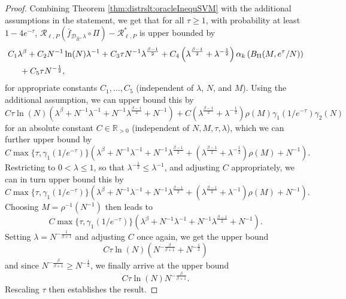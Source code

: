 \documentclass[letterpaper]{article} %
\newcommand{\R}{\mathbb{R}}
\newcommand{\Rp}{\R_{> 0}}
\newcommand{\dataSet}{\mathcal{D}}
\newcommand{\risk}{\mathcal{R}} %
\newcommand{\Risk}[2]{\risk_{{#1},{#2}}} %
\newcommand{\RiskBayes}[2]{\risk_{{#1},{#2}}^\ast} %
\newcommand{\hilbertianEmbed}{\Pi} %
\newcommand{\hilbertianEmbedBound}{B_\hilbertianEmbed} %
\newcommand{\clipped}[1]{\bar{#1}}
\begin{document}
\begin{proof}
Combining Theorem \ref{thm:distrslt:oracleInequSVM} with the additional assumptions in the statement, we get that for all $\tau\geq 1$, with probability at least $1-4e^{-\tau}$, $ \Risk{\ell}{P}(\clipped{f}_{\dataSet_{\hat\hilbertianEmbed},\lambda} \circ \hilbertianEmbed) - \RiskBayes{\ell}{P}$
is upper bounded by 
\begin{align*}
    & C_1 \lambda^\beta + C_2 N^{-1}\ln(N) \lambda^{-1} + C_3 \tau N^{-1} \lambda^{\frac{\beta-1}{2}} 
    + C_4\left(\lambda^{\frac{\beta-1}{2}} + \lambda^{-\frac12}\right)\alpha_k\left(\hilbertianEmbedBound(M,e^\tau/N)\right) \\
    & \hspace{0.5cm} + C_5 \tau N^{-\frac12},
\end{align*} 
for appropriate constants $C_1,\ldots,C_5$ (independent of $\lambda$, $N$, and $M$).
Using the additional assumption, we can upper bound this by
\begin{equation*}
    C \tau \ln(N) \left( \lambda^\beta + N^{-1}\lambda^{-1}  + N^{-1} \lambda^{\frac{\beta-1}{2}} + N^{-1} \right)
    + 
    C \left(\lambda^{\frac{\beta-1}{2}} + \lambda^{-\frac12}\right) \rho(M)\gamma_1(1/e^{-\tau})\gamma_2(N)
\end{equation*}
for an absolute constant $C\in\Rp$ (independent of $N,M,\tau,\lambda$), which we can further upper bound by
\begin{equation*}
    C \max\{\tau, \gamma_1(1/e^{-\tau})\} \left(
        \lambda^\beta + N^{-1}\lambda^{-1}  + N^{-1} \lambda^{\frac{\beta-1}{2}} + \left(\lambda^{\frac{\beta-1}{2}} + \lambda^{-\frac12}\right)\rho(M) + N^{-1}
    \right).
\end{equation*}
Restricting to $0<\lambda\leq 1$, so that $\lambda^{-\frac12} \leq \lambda^{-1}$, and adjusting $C$ appropriately, we can in turn upper bound this by
\begin{equation*}
     C \max\{\tau, \gamma_1(1/e^{-\tau})\} \left(
        \lambda^\beta + N^{-1}\lambda^{-1}  + N^{-1} \lambda^{\frac{\beta-1}{2}} + \left(\lambda^{\frac{\beta-1}{2}} + \lambda^{-1}\right)\rho(M) + N^{-1}
    \right).
\end{equation*}
Choosing $M=\rho^{-1}(N^{-1})$ then leads to
\begin{equation*}
         C \max\{\tau, \gamma_1(1/e^{-\tau})\} \left(
        \lambda^\beta + N^{-1}\lambda^{-1}  + N^{-1} \lambda^{\frac{\beta-1}{2}} + N^{-1}
    \right).
\end{equation*}
Setting $\lambda=N^{-\frac{1}{\beta+1}}$ and adjusting $C$ once again, we get the upper bound
\begin{equation*}
     C \tau \ln(N) \left( N^{-\frac{\beta}{\beta+1}} + N^{-\frac12} \right)
\end{equation*}
and since $N^{-\frac{\beta}{\beta+1}} \geq N^{-\frac12}$, we finally arrive at the upper bound
\begin{equation*}
    C \tau \ln(N) N^{-\frac{\beta}{\beta+1}}.
\end{equation*}
Rescaling $\tau$ then establishes the result.
\end{proof}
\end{document}
